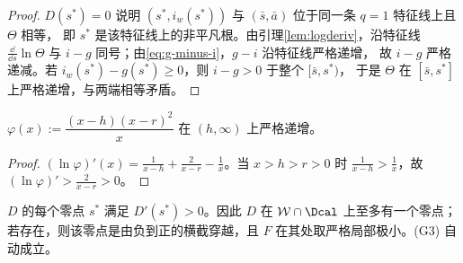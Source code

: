\begin{proof}
$D(s^*)=0$ 说明 $(s^*,i_w(s^*))$ 与 $(\bar s,\bar a)$ 位于同一条 $q=1$ 特征线上且 $\Theta$ 相等，
即 $s^*$ 是该特征线上的非平凡根。由引理\ref{lem:logderiv}，沿特征线
$\frac{\dd}{\dd s}\ln\Theta$ 与 $i-g$ 同号；由\eqref{eq:g-minus-i}，$g-i$ 沿特征线严格递增，
故 $i-g$ 严格递减。若 $i_w(s^*)-g(s^*)\ge0$，则 $i-g>0$ 于整个 $[\bar s,s^*)$，
于是 $\Theta$ 在 $[\bar s,s^*]$ 上严格递增，与两端相等矛盾。
\end{proof}

\begin{lemma}[辅助函数的单调性]
\label{lem:phi}
$\varphi(x):=\dfrac{(x-h)(x-r)^2}{x}$ 在 $(h,\infty)$ 上严格递增。
\end{lemma}

\begin{proof}
$(\ln\varphi)'(x)=\frac1{x-h}+\frac2{x-r}-\frac1x$。当 $x>h>r>0$ 时
$\frac1{x-h}>\frac1x$，故 $(\ln\varphi)'>\frac2{x-r}>0$。
\end{proof}

\begin{theorem}[横截性与唯一交点]
\label{thm:g3}
$D$ 的每个零点 $s^*$ 满足 $D'(s^*)>0$。因此 $D$ 在 $\mathcal W\cap\Dcal$ 上至多有一个零点；
若存在，则该零点是由负到正的横截穿越，且 $F$ 在其处取严格局部极小。(G3) 自动成立。
\end{theorem}


